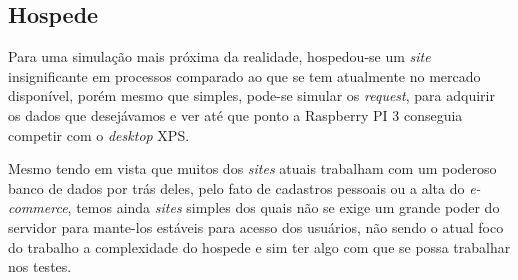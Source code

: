\documentclass[12pt]{article}
\begin{document}
    


  
  \subsection{Hospede} \label{sec:site}
    Para uma simulação mais próxima da realidade, hospedou-se um \textit{site} insignificante em processos comparado ao que se tem atualmente no mercado disponível, porém mesmo que simples, pode-se simular os \textit{request}, para adquirir os dados que desejávamos e ver até que ponto a Raspberry PI 3 conseguia competir com o \textit{desktop} XPS.


    Mesmo tendo em vista que muitos dos \textit{sites} atuais trabalham com um poderoso banco de dados por trás deles, pelo fato de cadastros pessoais ou a alta do \textit{e-commerce}, temos ainda \textit{sites} simples dos quais não se exige um grande poder do servidor para mante-los estáveis para acesso dos usuários, não sendo o atual foco do trabalho a complexidade do hospede e sim ter algo com que se possa trabalhar nos testes.
\end{document}
